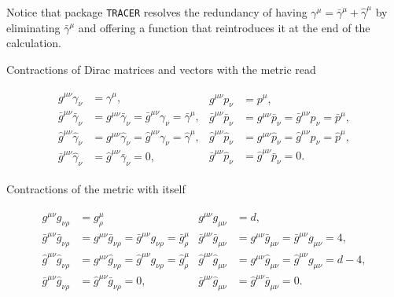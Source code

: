 \documentclass[../FeynCalcManual.tex]{subfiles}
\begin{document}
Notice that package \texttt{TRACER} resolves the redundancy of having
\(\gamma^\mu = \bar{\gamma}^\mu + \hat{\gamma}^\mu\) by eliminating
\(\bar{\gamma}^\mu\) and offering a function that reintroduces it at the
end of the calculation.

Contractions of Dirac matrices and vectors with the metric read

\begin{align}
\begin{split}
g^{\mu \nu} \gamma_\nu &= \gamma^\mu, \\
\bar{g}^{\mu \nu} \bar{\gamma}_\nu &= g^{\mu \nu} \bar{\gamma}_\nu = \bar{g}^{\mu \nu} \gamma_\nu = \bar{\gamma}^\mu, \\
\hat{g}^{\mu \nu} \hat{\gamma}_\nu &= g^{\mu \nu} \hat{\gamma}_\nu = \hat{g}^{\mu \nu} \gamma_\nu = \hat{\gamma}^\mu, \\
\bar{g}^{\mu \nu} \hat{\gamma}_\nu &= \hat{g}^{\mu \nu} \bar{\gamma}_\nu = 0,
\end{split} 
\begin{split}
g^{\mu \nu} p_\nu &= p^\mu, \\
\bar{g}^{\mu \nu} \bar{p}_\nu &= g^{\mu \nu} \bar{p}_\nu = \bar{g}^{\mu \nu} p_\nu = \bar{p}^\mu, \\
\hat{g}^{\mu \nu} \hat{p}_\nu &= g^{\mu \nu} \hat{p}_\nu = \hat{g}^{\mu \nu} p_\nu = \hat{p}^\mu, \\
\bar{g}^{\mu \nu} \hat{p}_\nu &= \hat{g}^{\mu \nu} \bar{p}_\nu = 0.
\end{split}
\end{align}

Contractions of the metric with itself

\begin{align}
\begin{split}
g^{\mu \nu} g_{\nu \rho} & = g^\mu_\rho \\
\bar{g}^{\mu \nu} \bar{g}_{\nu \rho} & =g^{\mu \nu} \bar{g}_{\nu \rho} = \bar{g}^{\mu \nu} g_{\nu \rho} = \bar{g}^\mu_\rho \\
\hat{g}^{\mu \nu} \hat{g}_{\nu \rho} & = g^{\mu \nu} \hat{g}_{\nu \rho} = \hat{g}^{\mu \nu} g_{\nu \rho}= \hat{g}^\mu_\rho \\
\bar{g}^{\mu \nu} \hat{g}_{\nu \rho} &= \hat{g}^{\mu \nu} \bar{g}_{\nu \rho}  = 0,
\end{split}
\begin{split}
g^{\mu \nu} g_{\mu \nu} & = d, \\
\bar{g}^{\mu \nu} \bar{g}_{\mu \nu} & = g^{\mu \nu} \bar{g}_{\mu \nu} = \bar{g}^{\mu \nu} g_{\mu \nu} = 4, \\
\hat{g}^{\mu \nu} \hat{g}_{\mu \nu} & = g^{\mu \nu} \hat{g}_{\mu \nu} = \hat{g}^{\mu \nu} g_{\mu \nu} = d-4, \\
\bar{g}^{\mu \nu} \hat{g}_{\mu \nu} &= \hat{g}^{\mu \nu} \bar{g}_{\mu \nu}  = 0.
\end{split}
\end{align}
\end{document}

